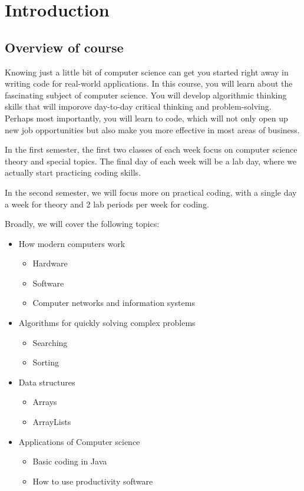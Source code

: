 \chapter{Introduction}

\section{Overview of course}

Knowing just a little bit of computer science can get you started right away in
writing code for real-world applications. In this course, you will learn about
the fascinating subject of computer science. You will develop algorithmic
thinking skills that will imporove day-to-day critical thinking and
problem-solving. Perhaps most importantly, you will learn to code, which will
not only open up new job opportunities but also make you more effective in most
areas of business.

 In the first semester, the first two classes of each
week focus on computer science theory and special topics. The final day of each
week will be a lab day, where we actually start practicing coding skills.

In the second semester, we will focus more on practical coding, with a single day a week for theory and 2 lab periods per week for coding. 

Broadly, we will cover the following topics:
\begin{itemize}
    \item How modern computers work
    	\begin{itemize}
       		\item Hardware
       		\item Software
       		\item Computer networks and information systems
    	\end{itemize}
    \item Algorithms for quickly solving complex problems
    	\begin{itemize}
       		\item Searching
       		\item Sorting
    	\end{itemize}
    \item Data structures 
    	\begin{itemize}
       		\item Arrays
       		\item ArrayLists
    	\end{itemize}
    \item Applications of Computer science
    	\begin{itemize}
       		\item Basic coding in Java
       		\item How to use productivity software
    	\end{itemize}
    \end{itemize}
    
